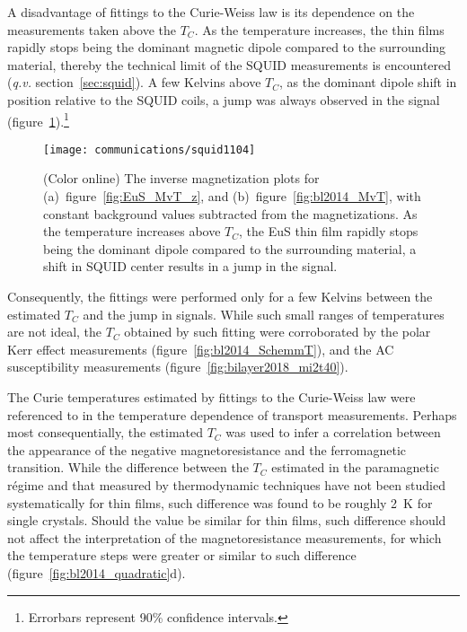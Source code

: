A disadvantage of fittings to the Curie-Weiss law is its dependence on the measurements taken above the $T_C$. As the temperature increases, the thin films rapidly stops being the dominant magnetic dipole compared to the surrounding material, thereby the technical limit of the SQUID measurements is encountered (\textit{q.v.} section~\ref{sec:squid}). A few Kelvins above $T_C$, as the dominant dipole shift in position relative to the SQUID coils, a jump was always observed in the signal (figure~\ref{fig:inverse_M}).\footnote{Errorbars represent 90\% confidence intervals.}%
\begin{figure}[ht]%
    \centering%
    \texttt{[image: communications/squid1104]}%
    \caption[Inverse magnetization plots for EuS thin films]{\label{fig:inverse_M}(Color online) The inverse magnetization plots for (a)~figure~\ref{fig:EuS_MvT_z}, and (b)~figure~\ref{fig:bl2014_MvT}, with constant background values subtracted from the magnetizations. As the temperature increases above $T_C$, the EuS thin film rapidly stops being the dominant dipole compared to the surrounding material, a shift in SQUID center results in a jump in the signal.}%
\end{figure} %
%
Consequently, the fittings were performed only for a few Kelvins between the estimated $T_C$ and the jump in signals. While such small ranges of temperatures are not ideal, the $T_C$ obtained by such fitting were corroborated by the polar Kerr effect measurements (figure~\ref{fig:bl2014_SchemmT}), and the AC susceptibility measurements (figure~\ref{fig:bilayer2018_mi2t40}).

The Curie temperatures estimated by fittings to the Curie-Weiss law were referenced to in the temperature dependence of transport measurements. Perhaps most consequentially, the estimated $T_C$ was used to infer a correlation between the appearance of the negative magnetoresistance and the ferromagnetic transition. While the difference between the $T_C$ estimated in the paramagnetic r\'egime and that measured by thermodynamic techniques have not been studied systematically for thin films, such difference was found to be roughly \SI{2}{K} for single crystals. Should the value be similar for thin films, such difference should not affect the interpretation of the magnetoresistance measurements, for which the temperature steps were greater or similar to such difference (figure~\ref{fig:bl2014_quadratic}d).